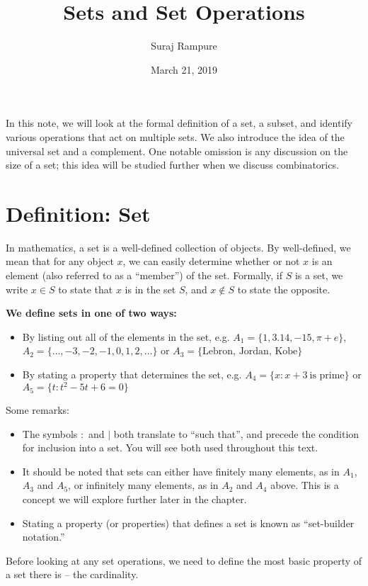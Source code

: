 \documentclass{article}
\title{Sets and Set Operations}
\author{Suraj Rampure}
\date{March 21, 2019}
\begin{document}
\maketitle

In this note, we will look at the formal definition of a set, a subset, and identify various operations that act on multiple sets. We also introduce the idea of the universal set and a complement. One notable omission is any discussion on the size of a set; this idea will be studied further when we discuss combinatorics.

\section{Definition: Set}
In mathematics, a set is a well-defined collection of objects. By well-defined,
we mean that for any object $x$, we can easily determine whether or not $x$ is an element
(also referred to as a “member”) of the set. Formally, if $S$ is a set, we write $x \in S$ to state that $x$ is in the set $S$, and $x \not \in S$ to state the opposite.

\textbf{We define sets in one of two ways:}
\begin{itemize}
  \item By listing out all of the elements in the set, e.g. $A_1 = \{1, 3.14, -15, \pi + e\}$, $A_2 = \{\dots, -3, -2, -1, 0, 1, 2, \dots\}$ or $A_3 = \{\text{Lebron, Jordan, Kobe}\}$
  \item By stating a property that determines the set, e.g. $A_4 = \{x : x + 3 \: \text{is prime} \}$ or $A_5 = \{t : t^2 - 5t + 6 = 0 \}$
\end{itemize}

 Some remarks: 
\begin{itemize}
  \item The symbols $:$ and $\big|$ both translate to “such that”, and precede the condition for inclusion into a set. You will see both used throughout this text. 
  \item It should be noted that sets can either have finitely many elements, as in $A_1$, $A_3$ and $A_5$, or infinitely many elements, as in $A_2$ and $A_4$ above. This is a concept we will explore further later in the chapter.
  \item Stating a property (or properties) that defines a set is known as “set-builder notation.”

\end{itemize}

Before looking at any set operations, we need to define the most basic property of a set there is -- the cardinality.
\end{document}
